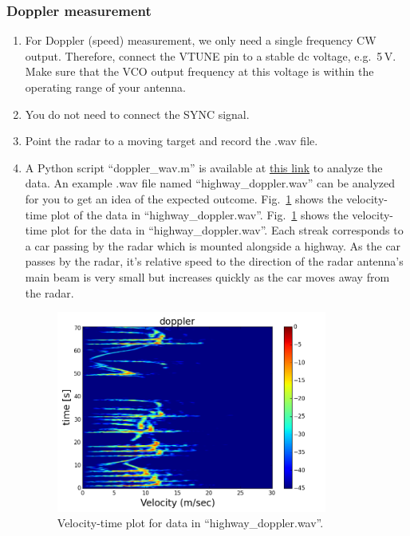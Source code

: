 \documentclass[letterpaper, 11pt]{article}
\begin{document}
\subsubsection{Doppler measurement}
	\begin{enumerate}
		\item For Doppler (speed) measurement, we only need a single frequency CW output. Therefore, connect the VTUNE pin to a stable dc voltage, e.g.~5\,V. Make sure that the VCO output frequency at this voltage is within the operating range of your antenna. 
		
		\item You do not need to connect the SYNC signal. 
		
		\item  Point the radar to a moving target and record the .wav file. 
		
		\item A Python script ``doppler\_wav.m'' is available at \href{https://github.com/ucdart/UCD-EEC134/blob/master/labs/lab6/code/doppler_realtime_audio.py}{this link} to analyze the data. An example .wav file named ``highway\_doppler.wav'' can be analyzed for you to get an idea of the expected outcome. Fig.~\ref{fig:doppler} shows the velocity-time plot of the data in ``highway\_doppler.wav''. Fig.~\ref{fig:doppler} shows the velocity-time plot for the data in ``highway\_doppler.wav''. Each streak corresponds to a car passing by the radar which is mounted alongside a highway. As the car passes by the radar, it's relative speed to the direction of the radar antenna's main beam is very small but increases quickly as the car moves away from the radar. 
		
		\begin{figure}[h]
			\centering
			\includegraphics[width=3.5in]{doppler.png}
			\caption{Velocity-time plot for data in ``highway\_doppler.wav''.} 
			\label{fig:doppler}
		\end{figure} 	
		

\end{enumerate}
\end{document}
